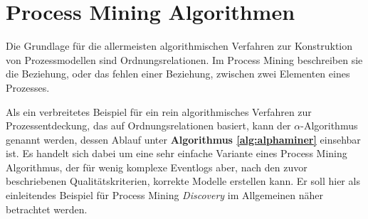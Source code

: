 
\section{Process Mining Algorithmen}
Die Grundlage für die allermeisten algorithmischen Verfahren zur Konstruktion von Prozessmodellen sind Ordnungsrelationen. Im Process Mining beschreiben sie die Beziehung, oder das fehlen einer Beziehung, zwischen zwei Elementen eines Prozesses. 

Als ein verbreitetes  Beispiel für ein rein algorithmisches Verfahren zur Prozessentdeckung, das auf Ordnungsrelationen basiert, kann der $\alpha$-Algorithmus genannt werden, dessen Ablauf unter \textbf{ Algorithmus \ref{alg:alphaminer}} einsehbar ist.
Es handelt sich dabei um eine sehr einfache Variante eines Process Mining Algorithmus, der für wenig komplexe Eventlogs aber, nach den zuvor beschriebenen Qualitätskriterien, korrekte Modelle erstellen kann. Er soll hier als einleitendes Beispiel für Process Mining \textit{Discovery} im Allgemeinen näher betrachtet werden. \newline

